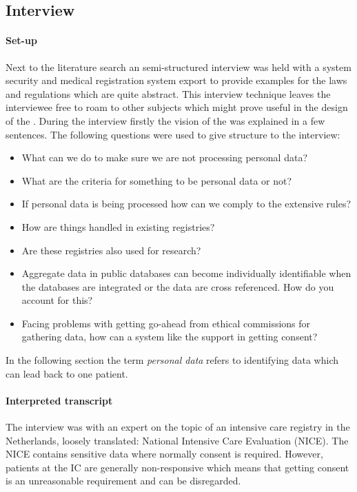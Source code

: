 \subsection{Interview}
\label{security-interviews}

\paragraph{Set-up} 
\label{security-set-up}

Next to the literature search an semi-structured interview was held with a system security and medical registration system export to provide examples for the laws and regulations which are quite abstract.
This interview technique leaves the interviewee free to roam to other subjects which might prove useful in the design of the \ivfsystem{}.
During the interview firstly the vision of the \ivfsystem{} was explained in a few sentences.
The following questions were used to give structure to the interview:

\begin{itemize}
	\item What can we do to make sure we are not processing personal data?
	\item What are the criteria for something to be personal data or not?
	\item If personal data is being processed how can we comply to the extensive rules?
	\item How are things handled in existing registries?
	\item Are these registries also used for research?
	\item Aggregate data in public databases can become individually identifiable when the databases are integrated or the data are cross referenced. 
	How do you account for this?
	\item Facing problems with getting go-ahead from ethical commissions for gathering data, how can a system like the \ivfsystem{} support in getting consent?
\end{itemize}

In the following section the term \emph{personal data} refers to identifying data which can lead back to one patient.

\paragraph{Interpreted transcript}
\label{security-interview-transcript}

The interview was with an expert on the topic of an intensive care registry in the Netherlands, loosely translated: National Intensive Care Evaluation (NICE).
The NICE contains sensitive data where normally consent is required. 
However, patients at the IC are generally non-responsive which means that getting consent is an unreasonable requirement and can be disregarded.

